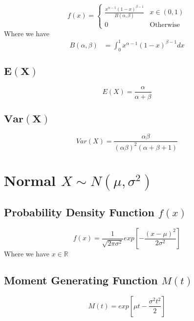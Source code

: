 \documentclass[12pt]{article}
\begin{document}
\begin{equation*}
  f(x) =
  \begin{cases}
     \frac{x^{\alpha -1} (1-x)^{\beta -1}}{B(\alpha,\beta)} & x \in (0,1) \\
     0 & \text{Otherwise}
  \end{cases}
\end{equation*}
Where we have
\begin{align*}
  B(\alpha,\beta) &= \int_{0}^{1}x^{\alpha -1}(1-x)^{\beta -1} dx
\end{align*}

\subsection{$\bm{E(X)}$}

\begin{equation*}
  E(X) = \frac{\alpha}{\alpha + \beta}
\end{equation*}

\subsection{$\bm{Var(X)}$}

\begin{equation*}
  Var(X)= \frac{\alpha \beta}{(\alpha \beta)^{2} (\alpha + \beta + 1)}
\end{equation*}

\newpage
\section{Normal $X \sim N(\mu,\sigma^{2})$}
\subsection{Probability Density Function $f(x)$}

\begin{equation*}
  f(x) = \frac{1}{\sqrt{2\pi \sigma^{2}}}exp \left [- \frac{(x-\mu)^{2}}{2\sigma^{2}}\right]
\end{equation*}
Where we have $x \in \mathbb{R}$

\subsection{Moment Generating Function $M(t)$}
\begin{equation*}
  M(t) = exp \left [\mu t - \frac{\sigma^{2} t^{2}}{2} \right]
\end{equation*}
\end{document}
